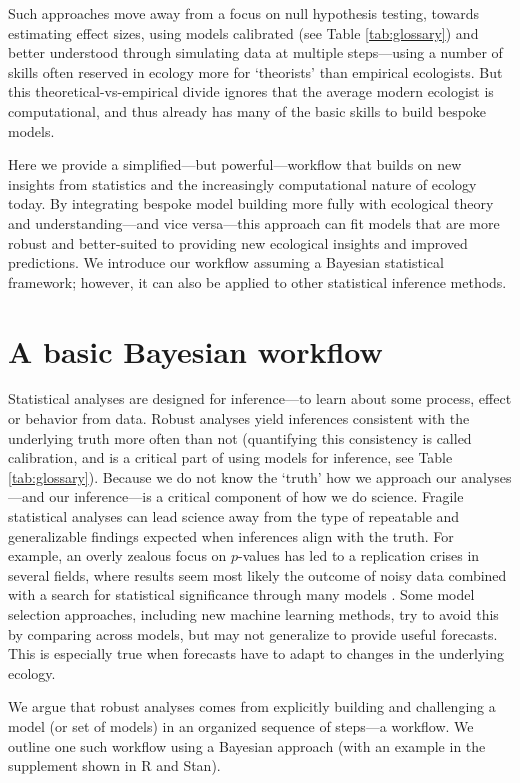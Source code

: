 \documentclass[11pt]{article}
\begin{document}
Such approaches move away from a focus on null hypothesis testing, towards estimating effect sizes, using models calibrated (see Table \ref{tab:glossary}) and better understood through simulating data at multiple steps---using a number of skills often reserved in ecology more for `theorists' than empirical ecologists.  But this theoretical-vs-empirical divide ignores that the average modern ecologist is computational, and thus already has many of the basic skills to build bespoke models. 

Here we provide a simplified---but powerful---workflow that builds on new insights from statistics  \citep{betanworkflow,vandeschoot2021} and the increasingly computational nature of ecology today. By integrating bespoke model building more fully with ecological theory and understanding---and vice versa---this approach can fit models that are more robust and better-suited to providing new ecological insights and improved predictions. We introduce our workflow assuming a Bayesian statistical framework; however, it can also be applied to other statistical inference methods. 

\section*{A basic Bayesian workflow}
Statistical analyses are designed for inference---to learn about some process, effect or behavior from data. Robust analyses yield inferences consistent with the underlying truth more often than not (quantifying this consistency is called calibration, and is a critical part of using models for inference, see Table \ref{tab:glossary}). Because we do not know the `truth' how we approach our analyses---and our inference---is a critical component of how we do science. Fragile statistical analyses can lead science away from the type of repeatable and generalizable findings expected when inferences align with the truth. For example, an overly zealous focus on $p$-values has led to a replication crises in several fields, where results seem most likely the outcome of noisy data combined with a search for statistical significance through many models \citep[effectively a garden of forking paths,][]{halsey2015,loken2017}. Some model selection approaches, including new machine learning methods, try to avoid this by comparing across models, but may not generalize to provide useful forecasts.  This is especially true when forecasts have to adapt to changes in the underlying ecology.

We argue that robust analyses comes from explicitly building and challenging a model (or set of models) in an organized sequence of steps---a workflow. We outline one such workflow using a Bayesian approach (with an example in the supplement shown in \textsf{R} and \textsf{Stan}). 
\end{document}
